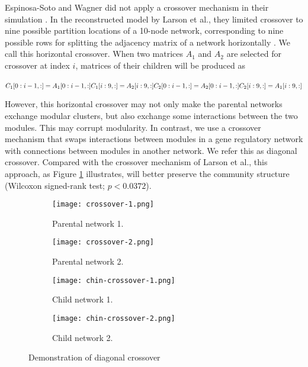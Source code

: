 Espinosa-Soto and Wagner did not apply a crossover mechanism in their simulation \cite{espinosa2010specialization}. In the reconstructed model by Larson et al., they limited crossover to nine possible partition locations of a 10-node network, corresponding to nine possible rows for splitting the adjacency matrix of a network horizontally \cite{larson2016recombination}. We call this horizontal crossover. When two matrices $A_{1}$ and $A_{2}$ are selected for crossover at index $i$, matrices of their children will be produced as \\ \\
$C_{1}[0: i-1, :] = A_{1}[0: i-1, :]\\
C_{1}[i: 9, :] = A_{2}[i: 9, :]\\
C_{2}[0: i-1, :] = A_{2}[0: i-1, :]\\
C_{2}[i: 9, :] = A_{1}[i: 9, :]\\$

However, this horizontal crossover may not only make the parental networks exchange modular clusters, but also exchange some interactions between the two modules. This may corrupt modularity. In contrast, we use a crossover mechanism that swaps interactions between modules in a gene regulatory network with connections between modules in another network. We refer this as diagonal crossover. Compared with the crossover mechanism of Larson et al., this approach, as Figure \ref{fig:diagnonal-crossover} illustrates, will better preserve the community structure (Wilcoxon signed-rank test; $p<0.0372$).
\begin{figure}[h!]
	\centering
	\begin{subfigure}[b]{0.4\linewidth}
		\texttt{[image: crossover-1.png]}
		\caption{Parental network 1.}
	\end{subfigure}
	\begin{subfigure}[b]{0.4\linewidth}
		\texttt{[image: crossover-2.png]}
		\caption{Parental network 2.}
	\end{subfigure}
	\begin{subfigure}[b]{0.4\linewidth}
		\texttt{[image: chin-crossover-1.png]}
		\caption{Child network 1.}
	\end{subfigure}
	\begin{subfigure}[b]{0.4\linewidth}
		\texttt{[image: chin-crossover-2.png]}
		\caption{Child network 2.}
	\end{subfigure}
	\caption{Demonstration of diagonal crossover}
	\label{fig:diagnonal-crossover}
\end{figure}
